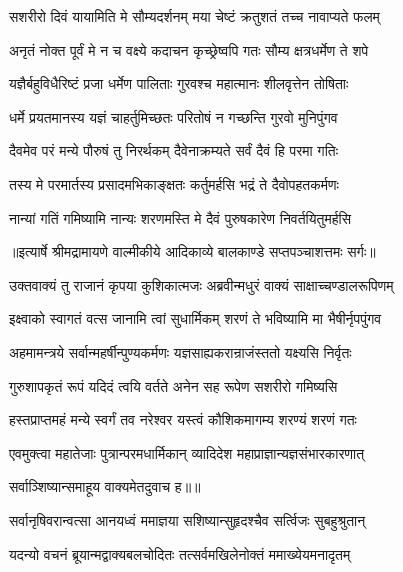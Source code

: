 \twolineshloka
{सशरीरो दिवं यायामिति मे सौम्यदर्शनम्}
{मया चेष्टं क्रतुशतं तच्च नावाप्यते फलम्} %

\twolineshloka
{अनृतं नोक्त पूर्वं मे न च वक्ष्ये कदाचन}
{कृच्छ्रेष्वपि गतः सौम्य क्षत्रधर्मेण ते शपे} %

\twolineshloka
{यज्ञैर्बहुविधैरिष्टं प्रजा धर्मेण पालिताः}
{गुरवश्च महात्मानः शीलवृत्तेन तोषिताः} %

\twolineshloka
{धर्मे प्रयतमानस्य यज्ञं चाहर्तुमिच्छतः}
{परितोषं न गच्छन्ति गुरवो मुनिपुंगव} %

\twolineshloka
{दैवमेव परं मन्ये पौरुषं तु निरर्थकम्}
{दैवेनाक्रम्यते सर्वं दैवं हि परमा गतिः} %

\twolineshloka
{तस्य मे परमार्तस्य प्रसादमभिकाङ्क्षतः}
{कर्तुमर्हसि भद्रं ते दैवोपहतकर्मणः} %

\twolineshloka
{नान्यां गतिं गमिष्यामि नान्यः शरणमस्ति मे}
{दैवं पुरुषकारेण निवर्तयितुमर्हसि} %


{॥इत्यार्षे श्रीमद्रामायणे वाल्मीकीये आदिकाव्ये बालकाण्डे सप्तपञ्चाशत्तमः सर्गः॥}


\twolineshloka
{उक्तवाक्यं तु राजानं कृपया कुशिकात्मजः}
{अब्रवीन्मधुरं वाक्यं साक्षाच्चण्डालरूपिणम्} %

\twolineshloka
{इक्ष्वाको स्वागतं वत्स जानामि त्वां सुधार्मिकम्}
{शरणं ते भविष्यामि मा भैषीर्नृपपुंगव} %

\twolineshloka
{अहमामन्त्रये सर्वान्महर्षीन्पुण्यकर्मणः}
{यज्ञसाह्यकरान्राजंस्ततो यक्ष्यसि निर्वृतः} %

\twolineshloka
{गुरुशापकृतं रूपं यदिदं त्वयि वर्तते}
{अनेन सह रूपेण सशरीरो गमिष्यसि} %

\twolineshloka
{हस्तप्राप्तमहं मन्ये स्वर्गं तव नरेश्वर}
{यस्त्वं कौशिकमागम्य शरण्यं शरणं गतः} %

\twolineshloka
{एवमुक्त्वा महातेजाः पुत्रान्परमधार्मिकान्}
{व्यादिदेश महाप्राज्ञान्यज्ञसंभारकारणात्} %

{सर्वाञ्शिष्यान्समाहूय वाक्यमेतदुवाच ह॥॥} %

\addtocounter{shlokacount}{1}

\twolineshloka
{सर्वानृषिवरान्वत्सा आनयध्वं ममाज्ञया}
{सशिष्यान्सुहृदश्चैव सर्त्विजः सुबहुश्रुतान्} %

\twolineshloka
{यदन्यो वचनं ब्रूयान्मद्वाक्यबलचोदितः}
{तत्सर्वमखिलेनोक्तं ममाख्येयमनादृतम्} %

